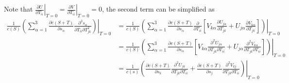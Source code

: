 \documentclass[10pt]{article}
\begin{document}
Note that $\left.\frac{\partial U}{\partial T_{ii}}\right|_{T=0} = \left.\frac{\partial V}{\partial T_{ii}}\right|_{T=0} = 0$, the second term can be simplified as 
\begin{align} \label{eqn:22}
	\frac{1}{c(S)}\left.\left( \sum_{\alpha=1}^3 \frac{\partial c(S+T)}{\partial s_\alpha} \frac{\partial^3 s_\alpha}{\partial T_{ii}\partial T^2_{jk}} \right)\right|_{T=0} &= \frac{1}{c(S)}\left.\left( \sum_{\alpha=1}^3 \frac{\partial c(S+T)}{\partial s_\alpha} \frac{\partial}{\partial T_{ii}} \left[ V_{k\alpha}\frac{\partial U_{j\alpha}}{\partial T_{jk}} + U_{j\alpha}\frac{\partial V_{k\alpha}}{\partial T_{jk}} \right] \right)\right|_{T=0} \nonumber \\
	&= \frac{1}{c(S)}\left.\left( \sum_{\alpha=1}^3 \frac{\partial c(S+T)}{\partial s_\alpha} \left[ V_{k\alpha}\frac{\partial^2 U_{j\alpha}}{\partial T_{jk} \partial T_{ii}} + U_{j\alpha}\frac{\partial^2 V_{k\alpha}}{\partial T_{jk} \partial T_{ii}} \right] \right)\right|_{T=0} \nonumber \\
	&= \frac{1}{c(s)} \left.\left( \frac{\partial c(S+T)}{\partial s_k}\frac{\partial^2 U_{jk}}{\partial T_{jk} \partial T_{ii}} + \frac{\partial c(S+T)}{\partial s_j} \frac{\partial^2 V_{kj}}{\partial T_{jk} \partial T_{ii}} \right)\right|_{T=0}
\end{align}
\end{document}

